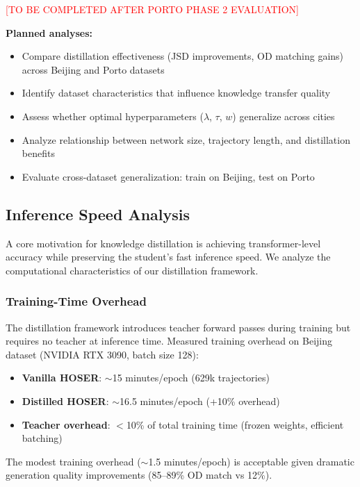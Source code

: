 \textcolor{red}{[TO BE COMPLETED AFTER PORTO PHASE 2 EVALUATION]}

\textbf{Planned analyses:}
\begin{itemize}[noitemsep,topsep=0pt]
    \item Compare distillation effectiveness (JSD improvements, OD matching gains) across Beijing and Porto datasets
    \item Identify dataset characteristics that influence knowledge transfer quality
    \item Assess whether optimal hyperparameters ($\lambda$, $\tau$, $w$) generalize across cities
    \item Analyze relationship between network size, trajectory length, and distillation benefits
    \item Evaluate cross-dataset generalization: train on Beijing, test on Porto
\end{itemize}

\subsection{Inference Speed Analysis}
\label{sec:eval-inference}

A core motivation for knowledge distillation is achieving transformer-level accuracy while preserving the student's fast inference speed. We analyze the computational characteristics of our distillation framework.

\subsubsection{Training-Time Overhead}

The distillation framework introduces teacher forward passes during training but requires no teacher at inference time. Measured training overhead on Beijing dataset (NVIDIA RTX 3090, batch size 128):

\begin{itemize}[noitemsep,topsep=0pt]
    \item \textbf{Vanilla HOSER}: $\sim$15 minutes/epoch (629k trajectories)
    \item \textbf{Distilled HOSER}: $\sim$16.5 minutes/epoch (+10\% overhead)
    \item \textbf{Teacher overhead}: $<$10\% of total training time (frozen weights, efficient batching)
\end{itemize}

The modest training overhead ($\sim$1.5 minutes/epoch) is acceptable given dramatic generation quality improvements (85--89\% OD match vs 12\%).

